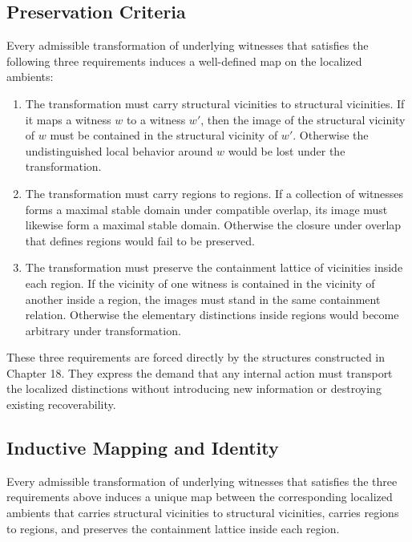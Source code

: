 \documentclass[12pt,anyside]{book}
\begin{document}
\subsection{Preservation Criteria}
Every admissible transformation of underlying witnesses that satisfies the following three requirements induces a well-defined map on the localized ambients:
\begin{enumerate}[label=\arabic*.]
    \item The transformation must carry structural vicinities to structural vicinities. If it maps a witness $w$ to a witness $w'$, then the image of the structural vicinity of $w$ must be contained in the structural vicinity of $w'$. Otherwise the undistinguished local behavior around $w$ would be lost under the transformation.
    \item The transformation must carry regions to regions. If a collection of witnesses forms a maximal stable domain under compatible overlap, its image must likewise form a maximal stable domain. Otherwise the closure under overlap that defines regions would fail to be preserved.
    \item The transformation must preserve the containment lattice of vicinities inside each region. If the vicinity of one witness is contained in the vicinity of another inside a region, the images must stand in the same containment relation. Otherwise the elementary distinctions inside regions would become arbitrary under transformation.
\end{enumerate}

These three requirements are forced directly by the structures constructed in Chapter 18. They express the demand that any internal action must transport the localized distinctions without introducing new information or destroying existing recoverability.

\subsection{Inductive Mapping and Identity}
\begin{theorem}
Every admissible transformation of underlying witnesses that satisfies the three requirements above induces a unique map between the corresponding localized ambients that carries structural vicinities to structural vicinities, carries regions to regions, and preserves the containment lattice inside each region.
\end{theorem}
\end{document}
